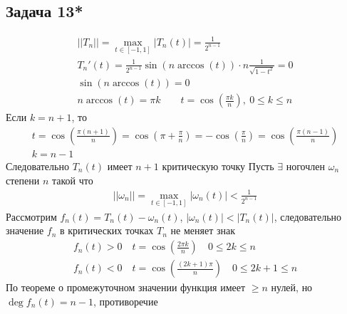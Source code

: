 \subsection*{Задача 13*}
	\begin{gather*}
		||T_n|| = \max\limits_{t \in [-1,1]}|T_n(t)| = \frac{1}{2^{n-1}}\\
		T_n'(t) = \frac{1}{2^{n-1}} \sin(n \arccos(t)) \cdot n \frac{1}{\sqrt{1 - t^2}} = 0\\
		\sin(n \arccos(t)) = 0\\
		n \arccos(t) = \pi k\qquad t = \cos\left(\frac{\pi k}{n}\right),\ 0 \leqslant k \leqslant n
	\end{gather*}
	Если $k = n + 1$, то
	\begin{gather*}
		t
		= \cos \left(\frac{\pi(n+1)}{n}\right)
		= \cos \left(\pi + \frac{\pi}{n}\right)
		= -\cos \left(\frac{\pi}{n}\right)
		= \cos \left(\frac{\pi(n-1)}{n}\right)\\
		k = n-1
	\end{gather*}
	Следовательно $T_n(t)$ имеет $n+1$ критическую точку
	\vskip 0.2in
	Пусть $\exists$ ногочлен $\omega_n$ степени $n$ такой что
	\begin{gather*}
		||\omega_n|| = \max\limits_{t \in [-1,1]}|\omega_n(t)| < \frac{1}{2^{n-1}}
	\end{gather*}
	Рассмотрим $f_n(t) = T_n(t) - \omega_n(t)$, $|\omega_n(t)| < |T_n(t)|$, следовательно значение $f_n$ в критических точках $T_n$ не меняет знак
	\begin{gather*}
		f_n(t) > 0\quad t = \cos\left(\frac{2\pi k}{n}\right)\quad 0 \leqslant 2k \leqslant n\\
		f_n(t) < 0\quad t = \cos\left(\frac{(2k + 1)\pi}{n}\right)\quad 0 \leqslant 2k + 1 \leqslant n
	\end{gather*}
	По теореме о промежуточном значении функция имеет $\geqslant n$ нулей, но $\operatorname{deg} f_n(t) = n-1$, противоречие